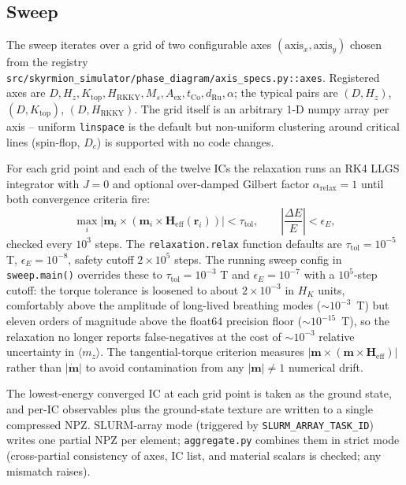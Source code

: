 \documentclass[11pt,a4paper]{article}
\newcommand{\mb}[1]{\mathbf{#1}}
\newcommand{\Heff}{\mb{H}_{\text{eff}}}
\newcommand{\tCo}{t_{\text{Co}}}
\newcommand{\dRu}{d_{\text{Ru}}}
\newcommand{\Aex}{A_{\text{ex}}}
\newcommand{\Ms}{M_s}
\newcommand{\HK}{H_K}
\newcommand{\Dc}{D_c}
\newcommand{\HRKKY}{H_{\text{RKKY}}}
\begin{document}
\subsection{Sweep}

The sweep iterates over a grid of two configurable axes
$(\text{axis}_x, \text{axis}_y)$ chosen from the registry
\texttt{src/skyrmion\_simulator/phase\_diagram/axis\_specs.py::axes}.
Registered axes are
$D, H_z, K_{\text{top}}, \HRKKY, \Ms, \Aex, \tCo, \dRu,
\alpha$; the typical pairs are $(D, H_z)$, $(D, K_{\text{top}})$,
$(D, \HRKKY)$. The grid itself is an arbitrary 1-D numpy
array per axis -- uniform \texttt{linspace} is the
default but non-uniform clustering around critical lines
(spin-flop, $\Dc$) is supported with no code changes.

For each grid point and each of the twelve ICs the
relaxation runs an RK4 LLGS integrator with $J = 0$ and
optional over-damped Gilbert factor $\alpha_{\text{relax}}
= 1$ until both convergence criteria fire:
%
\begin{equation}\label{eq:conv}
\max_i \bigl| \mb{m}_i \times
    (\mb{m}_i \times \Heff(\mb{r}_i)) \bigr|
    < \tau_{\text{tol}},
\qquad
\left| \frac{\Delta E}{E} \right| < \epsilon_E,
\end{equation}
%
checked every $10^3$ steps. The
\texttt{relaxation.relax} function defaults are
$\tau_{\text{tol}} = 10^{-5}$ T, $\epsilon_E = 10^{-8}$,
safety cutoff $2 \times 10^5$ steps. The running sweep
config in \texttt{sweep.main()} overrides these to
$\tau_{\text{tol}} = 10^{-3}$ T and
$\epsilon_E = 10^{-7}$ with a $10^5$-step cutoff: the
torque tolerance is loosened to about
$2 \times 10^{-3}$ in $\HK$ units, comfortably above the
amplitude of long-lived breathing modes
($\sim 10^{-3}$~T) but eleven orders of magnitude above
the float64 precision floor ($\sim 10^{-15}$~T), so the
relaxation no longer reports false-negatives at the cost
of $\sim 10^{-3}$ relative uncertainty in $\langle m_z
\rangle$. The tangential-torque criterion measures
$|\mb{m} \times (\mb{m} \times \Heff)|$ rather than
$|\dot{\mb{m}}|$ to avoid contamination from any
$|\mb{m}| \ne 1$ numerical drift.

The lowest-energy converged IC at each grid point is taken
as the ground state, and per-IC observables plus the
ground-state texture are written to a single compressed
NPZ. SLURM-array mode (triggered by
\texttt{SLURM\_ARRAY\_TASK\_ID}) writes one partial NPZ
per element; \texttt{aggregate.py} combines them in strict
mode (cross-partial consistency of axes, IC list, and
material scalars is checked; any mismatch raises).
\end{document}
